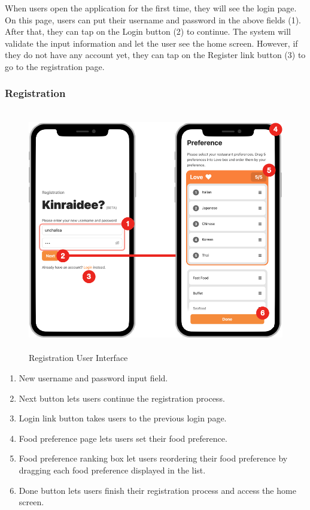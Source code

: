 \documentclass[12pt,oneside,openright,a4paper]{cpe-english-project}
\begin{document}
When users open the application for the first time, they will see the login page. On this page, users can put their username and password in the above fields (1). After that, they can tap on the Login button (2) to continue. The system will validate the input information and let the user see the home screen. However, if they do not have any account yet, they can tap on the Register link button (3) to go to the registration page.

\newpage
\subsubsection{Registration}
\begin{figure}[H]\centering
\includegraphics[height=300pt]{./images/4ui_RegistrationUserInterface.png}
\caption{Registration User Interface}\label{fig:4ui_RegistrationUserInterface}
\end{figure}

\begin{enumerate}
\item New username and password input field.
\item Next button lets users continue the registration process.
\item Login link button takes users to the previous login page.
\item Food preference page lets users set their food preference.
\item Food preference ranking box let users reordering their food preference by dragging each food preference displayed in the list.
\item Done button lets users finish their registration process and access the home screen.
\end{enumerate}
\end{document}
